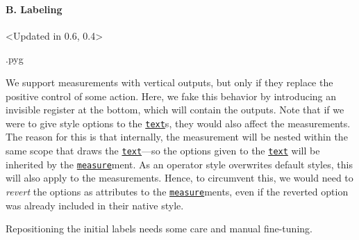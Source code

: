 \documentclass{scrartcl}
\makeatletter
\newenvironment{codeexample}{%
   \VerbatimEnvironment%
   \let\FVB@VerbatimOut\minted@FVB@VerbatimOut
   \let\FVE@VerbatimOut\minted@FVE@VerbatimOut
   \minted@configlang{tex}%
   \minted@fvset
   \begin{VerbatimOut}[codes={\catcode`\^^I=12},firstline,lastline]{\minted@jobname.pyg}%
}{
   \end{VerbatimOut}%
   \minted@langlinenoson%
   \savebox\codeexamplebox{ \minted@jobname.pyg}%
   \ifdim\wd\codeexamplebox>\dimexpr.5\linewidth-3mm\relax%
      \wd\codeexamplebox=.5\linewidth%
   \else%
      \wd\codeexamplebox=\dimexpr\wd\codeexamplebox+3mm\relax%
   \fi%
   \noindent\begin{minipage}{\wd\codeexamplebox}%
      \centering%
      \usebox\codeexamplebox%
   \end{minipage}%
   \begin{minipage}{\dimexpr\linewidth-\wd\codeexamplebox\relax}%
      \expandafter\minted@pygmentize\expandafter{\minted@lang}%
   \end{minipage}%
   \minted@langlinenosoff%
   \par%
}
\def\gate#1{\hyperref[gate:#1]{\texttt{#1}}}
\makeatother
\begin{document}
            \paragraph{B. Labeling}\leavevmode
               \begin{example}<Updated in 0.6, 0.4>
                  \begin{codeexample}
                  \end{codeexample}
                  We support measurements with vertical outputs, but only if they replace the positive control of some action.
                  Here, we fake this behavior by introducing an invisible register at the bottom, which will contain the outputs.
                  Note that if we were to give style options to the \gate{text}s, they would also affect the measurements.
                  The reason for this is that internally, the measurement will be nested within the same scope that draws the \gate{text}---so the options given to the \gate{text} will be inherited by the \gate{measure}ment.
                  As an operator style overwrites default styles, this will also apply to the measurements.
                  Hence, to circumvent this, we would need to \emph{revert} the options as attributes to the \gate{measure}ments, even if the reverted option was already included in their native style.

                  Repositioning the initial labels needs some care and manual fine\hyp tuning.
               \end{example}
\end{document}

